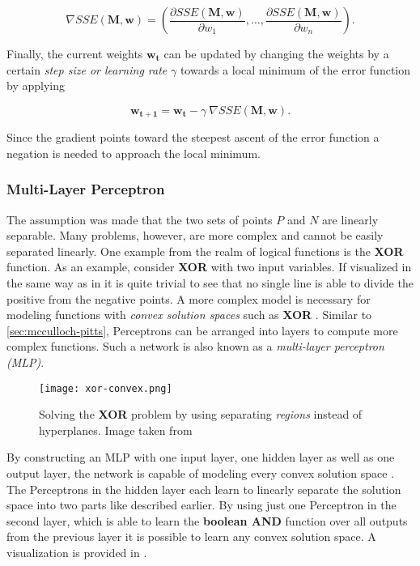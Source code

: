 \begin{equation}
    \nabla SSE(\bm{M}, \bm{w}) = \left(\frac{\partial SSE(\bm{M}, \bm{w})}{\partial w_1}, \dots, \frac{\partial SSE(\bm{M}, \bm{w})}{\partial w_n} \right).
\end{equation}

Finally, the current weights $\bm{w_t}$ can be updated by changing the weights by a certain \textit{step size or learning rate} $\gamma$ towards a local minimum of the error function by applying

\begin{equation}
    \label{eq:gradient-binary-update}
    \bm{w_{t+1}} = \bm{w_t} - \gamma ~ \nabla SSE(\bm{M}, \bm{w}).
\end{equation}

Since the gradient points toward the steepest ascent of the error function a negation is needed to approach the local minimum.

\subsubsection{Multi-Layer Perceptron}
The assumption was made that the two sets of points $P$ and $N$ are linearly separable.
Many problems, however, are more complex and cannot be easily separated linearly.
One example from the realm of logical functions is the \textbf{XOR} function.
As an example, consider \textbf{XOR} with two input variables.
If visualized in the same way as in  it is quite trivial to see that no single line is able to divide the positive from the negative points.
A more complex model is necessary for modeling functions with \textit{convex solution spaces} such as \textbf{XOR} .
Similar to \ref{sec:mcculloch-pitts}, Perceptrons can be arranged into layers to compute more complex functions.
Such a network is also known as a \textit{multi-layer perceptron (MLP)}.

\begin{figure}[htb!]
    \centering
    \texttt{[image: xor-convex.png]}
    \caption{Solving the \textbf{XOR} problem by using separating \textit{regions} instead of hyperplanes. Image taken from \cite{rojas_neural_1996}}
    \label{fig:xor-convex}
\end{figure}

By constructing an MLP with one input layer, one hidden layer as well as one output layer, the network is capable of modeling every convex solution space \cite{rojas_neural_1996}.
The Perceptrons in the hidden layer each learn to linearly separate the solution space into two parts like described earlier.
By using just one Perceptron in the second layer, which is able to learn the \textbf{boolean AND} function over all outputs from the previous layer it is possible to learn any convex solution space.
A visualization is provided in .

